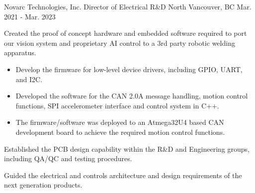 \begin{cventries}
    \cventry
    {Novarc Technologies, Inc.} %
    {Director of Electrical R\&D} %
    {North Vancouver, BC} %
    {Mar. 2021 - Mar. 2023} %
    { %
        \begin{cvitems}
            \item {Created the proof of concept hardware and embedded software required to port our vision system and proprietary AI control to a 3rd party robotic
                        welding apparatus.}
            \begin{itemize}
                \item {Develop the firmware for low-level device drivers, including GPIO, UART, and I2C.}
                \item {Developed the software for the CAN 2.0A message handling, motion control functions, SPI accelerometer interface and control system in C++.}
                \item {The firmware/software was deployed to an Atmega32U4 based CAN development board to achieve the required motion control functions.}
            \end{itemize}
            \item {Established the PCB design capability within the R\&D and Engineering groups, including QA/QC and testing procedures.}
            \item {Guided the electrical and controls architecture and design requirements of the next generation products.}
        \end{cvitems}
    }




\end{cventries}
